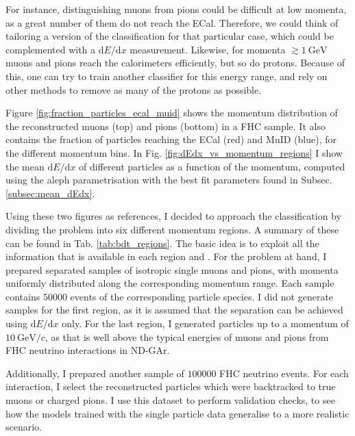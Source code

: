 For instance, distinguishing muons from pions could be difficult at low momenta, as a great number of them do not reach the ECal. Therefore, we could think of tailoring a version of the classification for that particular case, which could be complemented with a $\mathrm{d}E/\mathrm{d}x$ measurement. Likewise, for momenta $\gtrsim 1~\mathrm{GeV}$ muons and pions reach the calorimeters efficiently, but so do protons. Because of this, one can try to train another classifier for this energy range, and rely on other methods to remove as many of the protons as possible.

Figure \ref{fig:fraction_particles_ecal_muid} shows the momentum distribution of the reconstructed muons (top) and pions (bottom) in a FHC sample. It also contains the fraction of particles reaching the ECal (red) and MuID (blue), for the different momentum bins. In Fig. \ref{fig:dEdx_vs_momentum_regions} I show the mean $\mathrm{d}E/\mathrm{d}x$ of different particles as a function of the momentum, computed using the \gls{aleph} parametrisation with the best fit parameters found in Subsec. \ref{subsec:mean_dEdx}.

Using these two figures as references, I decided to approach the classification by dividing the problem into six different momentum regions. A summary of these can be found in Tab. \ref{tab:bdt_regions}. The basic idea is to exploit all the information that is available in each region and . For the problem at hand, I prepared separated samples of isotropic single muons and pions, with momenta uniformly distributed along the corresponding momentum range. Each sample contains $50000$ events of the corresponding particle species. I did not generate samples for the first region, as it is assumed that the separation can be achieved using $\mathrm{d}E/\mathrm{d}x$ only. For the last region, I generated particles up to a momentum of $10~\mathrm{GeV}/c$, as that is well above the typical energies of muons and pions from FHC neutrino interactions in ND-GAr.

Additionally, I prepared another sample of $100000$ FHC neutrino events. For each interaction, I select the reconstructed particles which were backtracked to true muons or charged pions. I use this dataset to perform validation checks, to see how the models trained with the single particle data generalise to a more realistic scenario.

